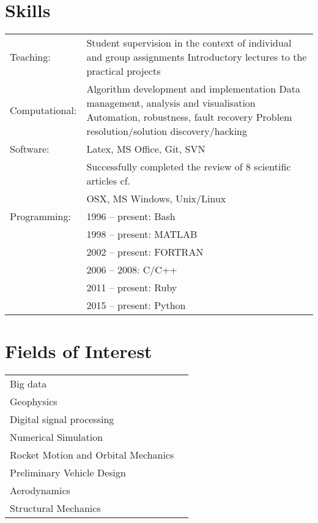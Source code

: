 \documentclass[a4paper]{article}
\newcommand{\dynhref}[2]{%
  \iftoggle{expliciturl}{%
    #2 (\href{#1}{\texttt{\detokenize{#1}}})%
  }{%
    \href{#1}{#2}%
  }%
}
\newcommand{\procv}[2]{\iftoggle{professionalcv}{#1}{#2}}
\newlength{\listskipbig}
\newenvironment{cvsection}[2]{
  \vspace{0.15in}
  \section*{#1}
  \vspace{-0.2in}
  \begin{longtable}{lp{#2}}
}{
  \end{longtable}
}
\begin{document}
\begin{cvsection}{Skills}{11.2cm}
Teaching:      & Student supervision in the context of individual and group assignments\newline
                 Introductory lectures to the practical projects\\[\listskipbig]

Computational:  & Algorithm development and implementation\newline
                  Data management, analysis and visualisation\newline
                  Automation, robustness, fault recovery\newline
                  Problem resolution\slash solution discovery\slash hacking\\[\listskipbig]
Software: & Latex, MS Office, Git, SVN\\[\listskipbig]
\procv{}{
Articles review: & Successfully completed the review of 8 scientific articles cf. \dynhref{https://publons.com/a/782170/}{Publons}\\[\listskipbig]
}

Operating Systems: & OSX, MS Windows, Unix/Linux \\[\listskipbig]

Programming:
& 1996 -- present: Bash \\
& 1998 -- present: MATLAB \\
& 2002 -- present: FORTRAN \\
& 2006 -- 2008: C/C++ \\
& 2011 -- present: Ruby \\
& 2015 -- present: Python\\[\listskipbig]
\end{cvsection}


\begin{cvsection}{Fields of Interest}{10cm}
 Big data & \\
 Geophysics & \\
 Digital signal processing & \\
 Numerical Simulation & \\
 Rocket Motion and Orbital Mechanics & \\
 Preliminary Vehicle Design & \\
 Aerodynamics & \\
 Structural Mechanics & \\
\end{cvsection}

\end{document}
